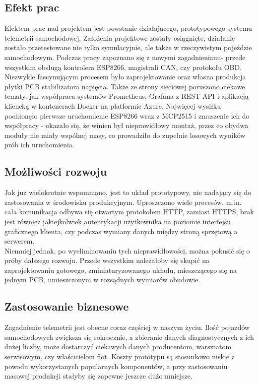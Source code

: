 \documentclass[10pt,a4paper]{scrartcl}
\begin{document}
		\subsection{Efekt prac}
		Efektem prac nad projektem jest powstanie działającego, prototypowego systemu telemetrii samochodowej. Założenia projektowe zostały osiągnięte, działanie zostało przetestowane nie tylko symulacyjnie, ale także w rzeczywistym pojeździe samochodowym. Podczas pracy zapoznano się z nowymi zagadnieniami- przede wszystkim obsługą kontrolera ESP8266, magistrali CAN, czy protokołu OBD. Niezwykle fascynującym procesem było zaprojektowanie oraz własna produkcja płytki PCB stabilizatora napięcia. Także ze strony sieciowej poruszono ciekawe tematy, jak współpraca systemów Prometheus, Grafana z REST API i aplikacją kliencką w kontenerach Docker na platformie Azure. Najwięcej wysiłku pochłonęło pierwsze uruchomienie ESP8266 wraz z MCP2515 i zmuszenie ich do współpracy - okazało się, że winien był nieprawidłowy montaż, przez co obydwa moduły nie miały wspólnej masy, co prowadziło do zupełnie losowych wyników prób ich uruchomienia.
		
		\subsection{Możliwości rozwoju}
		Jak już wielokrotnie wspomniano, jest to układ prototypowy, nie nadający się do zastosowania w środowisku produkcyjnym. Uproszczono wiele procesów, m.in. cała komunikacja odbywa się otwartym protokołem HTTP, zamiast HTTPS, brak jest również jakiejkolwiek autentykacji użytkownika na poziomie interfejsu graficznego klienta, czy podczas wymiany danych między stroną sprzętową a serwerem.\\
		Niemniej jednak, po wyeliminowaniu tych nieprawidłowości, można pokusić się o próby dalszego rozwoju. Przede wszystkim należałoby się skupić na zaprojektowaniu gotowego, zminiaturyzowanego układu, mieszczącego się na jednym PCB, umieszczonym w rozsądnych wymiarów obudowie.
		
		\subsection{Zastosowanie biznesowe}
		Zagadnienie telemetrii jest obecne coraz częściej w naszym życiu. Ilość pojazdów samochodowych zwiększa się rokrocznie, a zbieranie danych diagnostycznych z ich dużej liczby, może dostarczyć ciekawych danych producentom, warsztatom serwisowym, czy właścicielom flot. Koszty prototypu są stosunkowo niskie z powodu wykorzystanych popularnych komponentów, a przy zastosowaniu masowej produkcji stałyby się zapewne jeszcze dużo mniejsze.
		\pagebreak
		\tableofcontents
\end{document}
